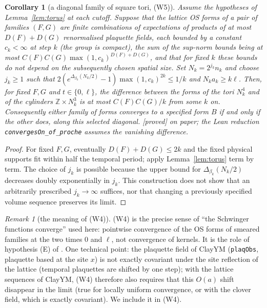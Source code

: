 \documentclass[11pt,a4paper]{article}
\theoremstyle{plain}
\newtheorem{corollary}[theorem]{Corollary}
\theoremstyle{definition}
\theoremstyle{remark}
\newtheorem{remark}[theorem]{Remark}
\numberwithin{equation}{section}
\newcommand{\Z}{\mathbb{Z}}
\newcommand{\st}[1]{\textsf{[#1]}}
\begin{document}
\begin{corollary}[a diagonal family of square tori, (W5)]\label{cor:tori}
Assume the hypotheses of Lemma~\ref{lem:torus} at each cutoff. Suppose that the lattice OS forms of a pair of families $(F,G)$ are finite
combinations of expectations of products of at most $D(F)+D(G)$ renormalised plaquette fields, each bounded by a constant $c_k<\infty$ at step
$k$ (the group is compact), the sum of the sup-norm bounds being at most $C(F)C(G)\max(1,c_k)^{D(F)+D(G)}$, and that for fixed $k$ these
bounds do not depend on the subsequently chosen spatial size. Set $N_k=2^{j_k}n_k$ and choose $j_k\ge1$ such that
$2(e^{\Delta_{\beta_k}(N_k/2)}-1)\max(1,c_k)^{2k}\le1/k$ and $N_ka_k\ge k\ell$. Then, for fixed $F,G$ and $t\in\{0,\ell\}$, the difference between the
forms of the tori $N_k^4$ and of the cylinders $\Z\times N_k^3$ is at most $C(F)C(G)/k$ from some $k$ on. Consequently either family of forms
converges to a specified form $B$ if and only if the other does, along this selected diagonal. \st{proved} on paper; the Lean reduction
\texttt{convergesOn\_of\_proche} \emph{assumes} the vanishing difference.
\end{corollary}
\begin{proof}
For fixed $F,G$, eventually $D(F)+D(G)\le2k$ and the fixed physical supports fit within half the temporal period; apply
Lemma~\ref{lem:torus} term by term. The choice of $j_k$ is possible because the upper bound for $\Delta_{\beta_k}(N_k/2)$ decreases doubly
exponentially in $j_k$. This construction does not show that an arbitrarily prescribed $j_k\to\infty$ suffices, nor that changing a previously
specified volume sequence preserves its limit.
\end{proof}

\begin{remark}[the meaning of (W4)]\label{rem:W4}
(W4) is the precise sense of ``the Schwinger functions converge'' used here: pointwise convergence of the OS forms of smeared families at
the two times $0$ and $\ell$, not convergence of kernels. It is the role of hypothesis (E) of \cite{BB26}. One technical point: the
plaquette field of ClayYM (\texttt{plaqObs}, plaquette based at the site $x$) is not exactly covariant under the site reflection of the
lattice (temporal plaquettes are shifted by one step); with the lattice sequences of ClayYM, (W4) therefore also requires that this
$O(a)$ shift disappear in the limit (true for locally uniform convergence, or with the clover field, which is exactly covariant). We
include it in (W4).
\end{remark}
\end{document}
